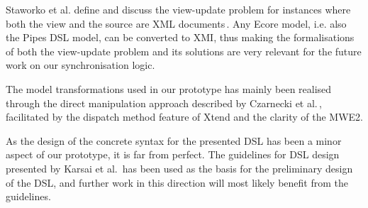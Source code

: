 Staworko et al. define and discuss the view-update problem for instances where both the view and the source are XML documents\,\cite{staworko10}. Any Ecore model, i.e. also the Pipes DSL model, can be converted to XMI, thus making the formalisations of both the view-update problem and its solutions are very relevant for the future work on our synchronisation logic.

The model transformations used in our prototype has mainly been realised through the direct manipulation approach described by Czarnecki et al.\,\cite{czarnecki06}, facilitated by the dispatch method feature of Xtend and the clarity of the MWE2.

As the design of the concrete syntax for the presented DSL has been a minor aspect of our prototype, it is far from perfect. The guidelines for DSL design presented by Karsai et al.\,\cite{karsai09} has been used as the basis for the preliminary design of the DSL, and further work in this direction will most likely benefit from the guidelines.



